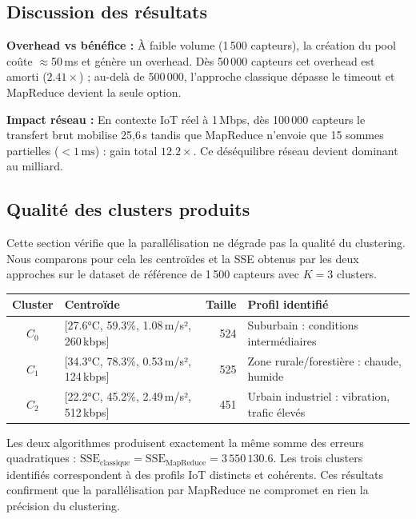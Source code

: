 \documentclass[12pt,a4paper]{article}
\begin{document}
\subsection{Discussion des résultats}

\noindent\textbf{Overhead vs bénéfice :} À faible volume (1\,500 capteurs), la création du pool coûte
$\approx$50\,ms et génère un overhead. Dès 50\,000 capteurs cet overhead est amorti ($2.41\times$) ;
au-delà de 500\,000, l'approche classique dépasse le timeout et MapReduce devient la seule option.

\noindent\textbf{Impact réseau :} En contexte IoT réel à 1\,Mbps, dès 100\,000 capteurs le
transfert brut mobilise 25,6\,s tandis que MapReduce n'envoie que 15 sommes partielles
($<\!1\,\text{ms}$) : gain total $12.2\times$. Ce déséquilibre réseau devient dominant au milliard.

\subsection{Qualité des clusters produits}

Cette section vérifie que la parallélisation ne dégrade pas la qualité du clustering.
Nous comparons pour cela les centroïdes et la SSE obtenus par les deux approches sur
le dataset de référence de 1\,500 capteurs avec $K=3$ clusters.

\begin{center}
\small
\begin{tabular}{clrp{5cm}}
\toprule
\textbf{Cluster} & \textbf{Centroïde} & \textbf{Taille} & \textbf{Profil identifié} \\
\midrule
$C_0$ & [27.6°C, 59.3\%, 1.08\,m/s², 260\,kbps] & 524 &
  Suburbain : conditions intermédiaires \\[3pt]
$C_1$ & [34.3°C, 78.3\%, 0.53\,m/s², 124\,kbps] & 525 &
  Zone rurale/forestière : chaude, humide \\[3pt]
$C_2$ & [22.2°C, 45.2\%, 2.49\,m/s², 512\,kbps] & 451 &
  Urbain industriel : vibration, trafic élevés \\
\bottomrule
\end{tabular}
\end{center}

\noindent Les deux algorithmes produisent exactement la même somme des erreurs
quadratiques : $\text{SSE}_{\text{classique}} = \text{SSE}_{\text{MapReduce}} = 3\,550\,130.6$.
Les trois clusters identifiés correspondent à des profils IoT distincts et cohérents.
Ces résultats confirment que la parallélisation par MapReduce ne compromet en rien
la précision du clustering.
\end{document}
